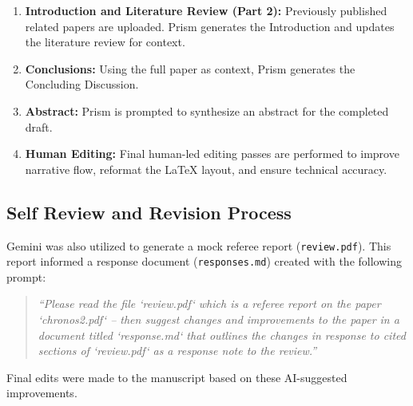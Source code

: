 \documentclass[twocolumn]{article}
\begin{document}
\begin{enumerate}[label=\arabic*.]
    \item \textbf{Introduction and Literature Review (Part 2):} Previously published related papers are uploaded. Prism generates the Introduction and updates the literature review for context.
    \item \textbf{Conclusions:} Using the full paper as context, Prism generates the Concluding Discussion.
    \item \textbf{Abstract:} Prism is prompted to synthesize an abstract for the completed draft.
    \item \textbf{Human Editing:} Final human-led editing passes are performed to improve narrative flow, reformat the \LaTeX{} layout, and ensure technical accuracy.
\end{enumerate}

\subsection*{Self Review and Revision Process}
Gemini was also utilized to generate a mock referee report (\texttt{review.pdf}). This report informed a response document (\texttt{responses.md}) created with the following prompt: 
\begin{quote}
    \textit{``Please read the file ‘review.pdf‘ which is a referee report on the paper ‘chronos2.pdf‘ – then suggest changes and improvements to the paper in a document titled ‘response.md‘ that outlines the changes in response to cited sections of ‘review.pdf‘ as a response note to the review.''}
\end{quote}
Final edits were made to the manuscript based on these AI-suggested improvements. 

\end{document}

